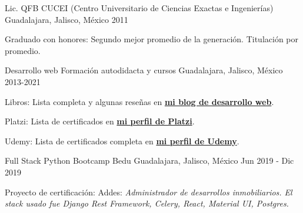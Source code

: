 

\begin{cventries}
  \cventry
    {Lic. QFB}
    {CUCEI (Centro Universitario de Ciencias Exactas e Ingenierías)}
    {Guadalajara, Jalisco, México}
    {2011}
    {
      \begin{cvitems}
        \item {Graduado con honores: Segundo mejor promedio de la generación. Titulación por promedio.}
      \end{cvitems}
    }

    \cventry
    {Desarrollo web}
    {Formación autodidacta y cursos}
    {Guadalajara, Jalisco, México}
    {2013-2021}
    {
      \begin{cvitems}
        \item {Libros: Lista completa y algunas reseñas en \color{gray} \textbf{ \href{https://coffeebytes.dev/libros-que-he-leido-y-resenas/}{mi blog de desarrollo web}}.}
        \item {Platzi: Lista de certificados en \color{gray} \textbf{\href{https://platzi.com/@eduardo-zepeda/}{mi perfil de Platzi}}.}
        \item {Udemy: Lista de certificados completa en \color{gray} \textbf{\href{https://www.udemy.com/user/carlos-eduardo-magallon-zepeda/}{mi perfil de Udemy}}.}
      \end{cvitems}
    }

    \cventry
    {Full Stack Python Bootcamp}
    {Bedu}
    {Guadalajara, Jalisco, México}
    {Jun 2019 - Dic 2019}
    {
      \begin{cvitems}
        \item {Proyecto de certificación: Addes: \textit{Administrador de desarrollos inmobiliarios. El stack usado fue Django Rest Framework, Celery, React, Material UI, Postgres.}}
      \end{cvitems}
    }
\end{cventries}